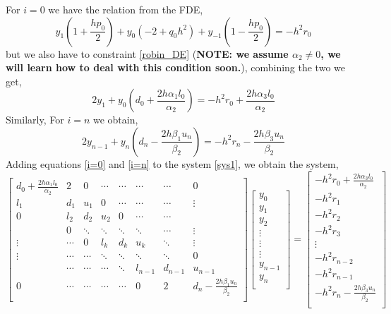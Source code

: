 \documentclass[12pt]{article}
\begin{document}
	For $ i = 0 $
	we have the relation from the FDE,
	\begin{equation}\label{fde_a}
		 y_{1}\left(1+\frac{h p_0}{2}\right) + y_0\left(-2+q_0 h^2\right)+y_{-1}\left(1-\frac{h p_0}{2}\right) = -h^2r_0 
	\end{equation}
	but we also have to constraint \ref{robin_DE} (\textbf{NOTE: we assume $ \alpha_2 \neq 0 $, we will learn how to deal with this condition soon.}), combining the two we get,
	\begin{equation}\label{i=0}
		2 y_1 + y_0 \left(d_0 + \frac{2h \alpha_1 l_0}{\alpha_2}\right) = -h^2r_0 + \frac{2h \alpha_3 l_0}{\alpha_2}
	\end{equation}
	Similarly, For $ i = n $ we obtain,
	\begin{equation}\label{i=n}
		2 y_{n-1} + y_n \left(d_n - \frac{2h \beta_1 u_n}{\beta_2}\right) = -h^2r_n - \frac{2h \beta_3 u_n}{\beta_2}
	\end{equation}
	Adding equations \ref{i=0} and \ref{i=n} to the system \ref{sys1}, we obtain the system,
		\begin{equation} \label{sys2}
		\left[ \begin{matrix}
			d_0 + \frac{2h \alpha_1 l_0}{\alpha_2} & 2 & 0 & \cdots &\cdots &\cdots&\cdots& 0\\
			l_1 & d_1 & u_1 & 0 &\cdots &\cdots&\cdots& \vdots\\
			0&l_2 & d_2 & u_2 &0 &\cdots&\cdots& \\
			&0 & \ddots & \ddots &\ddots &\ddots&\cdots & \vdots\\
			\vdots&\cdots&0&l_k & d_k & u_k &\ddots& \vdots\\
			\vdots&\cdots&\cdots&\ddots & \ddots & \ddots &\ddots& 0\\
			&\cdots&\cdots& \cdots&\ddots & l_{n-1} &d_{n-1}& u_{n-1}\\
			0&\cdots&\cdots& \cdots&\cdots & 0 & 2 & d_n - \frac{2h \beta_1 u_n}{\beta_2} \\
		\end{matrix} \right]
		\left[ \begin{matrix}
			y_0\\
			y_1\\
			y_2\\
			\vdots\\
			\vdots\\
			\vdots\\
			y_{n-1}\\
			y_{n}\\
		\end{matrix} \right] =
		\left[ \begin{matrix}
			-h^2r_0 + \frac{2h \alpha_3 l_0}{\alpha_2} \\
			- h^2 r_1\\
			- h^2 r_2\\
			- h^2 r_3\\
			\vdots\\
			- h^2 r_{n-2}\\
			- h^2 r_{n-1}\\
			-h^2r_n - \frac{2h \beta_3 u_n}{\beta_2}\\
		\end{matrix} \right]
	\end{equation}
\end{document}
